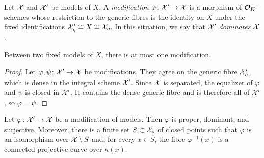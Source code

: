 \begin{definition}\label{def:modification-of-models}
    Let $\mathcal X$ and $\mathcal X'$ be models of $X$.
    A \textit{modification} $\varphi\colon\mathcal X'\to\mathcal X$ is a morphism of $\mathcal O_K$-schemes whose restriction to the generic fibres is the identity on $X$ under the fixed identifications $\mathcal X'_\eta\cong X\cong\mathcal X_\eta$.
    In this situation, we say that $\mathcal X'$ \textit{dominates} $\mathcal X$.
\end{definition}

\begin{lemma}\label{lem:uniqueness-of-modifications}
    Between two fixed models of $X$, there is at most one modification.
\end{lemma}

\begin{proof}
    Let $\varphi,\psi\colon\mathcal X'\to\mathcal X$ be modifications.
    They agree on the generic fibre $\mathcal X'_\eta$, which is dense in the integral scheme $\mathcal X'$.
    Since $\mathcal X$ is separated, the equalizer of $\varphi$ and $\psi$ is closed in $\mathcal X'$.
    It contains the dense generic fibre and is therefore all of $\mathcal X'$, so $\varphi=\psi$.
\end{proof}

\begin{proposition}\label{prop:elementary-properties-of-modifications}
    Let $\varphi\colon\mathcal X'\to\mathcal X$ be a modification of models.
    Then $\varphi$ is proper, dominant, and surjective.
    Moreover, there is a finite set $S\subset\mathcal X_s$ of closed points such that $\varphi$ is an isomorphism over $\mathcal X\setminus S$ and, for every $x\in S$, the fibre $\varphi^{-1}(x)$ is a connected projective curve over $\kappa(x)$.
\end{proposition}

